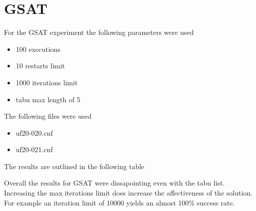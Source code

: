 \section{GSAT}

For the GSAT experiment the following parameters were used

\begin{itemize}
  \item 100 executions
  \item 10 restarts limit
  \item 1000 iterations limit
  \item tabu max length of 5
\end{itemize}

The following files were used 

\begin{itemize}
  \item uf20-020.cnf
  \item uf20-021.cnf
\end{itemize}

The results are outlined in the following table

\begin{table}[H]
\end{table}

Overall the results for GSAT were dissapointing even with the tabu list. Increasing the max iterations limit does increase the affectiveness of the solution. For example an iteration limit of 10000 yields an almost 100\% success rate.

